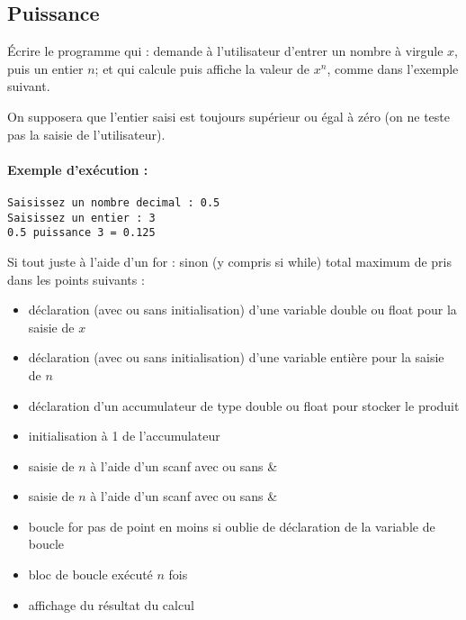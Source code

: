\subsection{Puissance}

\question Écrire le programme qui : demande à l'utilisateur d'entrer
un nombre à virgule $x$, puis un entier $n$; et qui calcule puis affiche
la valeur de $x^n$, comme dans l'exemple suivant. 

On supposera que l'entier saisi est toujours supérieur ou égal à zéro
(on ne teste pas la saisie de l'utilisateur).

\paragraph{Exemple d'exécution :}
\begin{small}
\begin{verbatim}
Saisissez un nombre decimal : 0.5
Saisissez un entier : 3
0.5 puissance 3 = 0.125
\end{verbatim}
\end{small}


\begin{correction}
  \begin{small}
  \end{small}
  
  \begin{baremeenv}
Si tout juste à l'aide d'un for :  sinon (y compris si while) total maximum de
 pris dans les points suivants :
    \begin{itemize}
      \item {}  déclaration (avec ou sans initialisation) d'une variable
        double ou float pour la saisie de $x$
      \item {}  déclaration (avec ou sans initialisation) d'une variable
        entière pour la saisie de $n$
      \item {} déclaration d'un accumulateur de type double ou float pour stocker le
      produit 
    \item {} initialisation à 1 de l'accumulateur
      \item {} saisie de $n$ à l'aide d'un scanf avec ou sans \&
      \item {} saisie de $n$ à l'aide d'un scanf avec ou sans \&
      \item {} boucle for pas de point en moins si oublie de
        déclaration de la variable de boucle
      \item {} bloc de boucle exécuté $n$ fois
    \item {} affichage du résultat du calcul
    \end{itemize}
  \end{baremeenv}
\end{correction}


